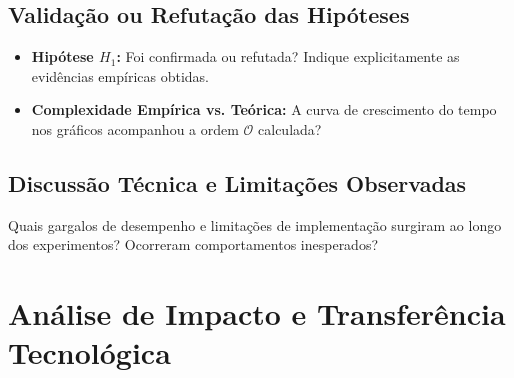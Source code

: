 \documentclass[11pt,a4paper]{article}
\begin{document}
\begin{table}[ht]
\centering
\caption{Desempenho comparativo de tempo e memória em função do tamanho da entrada $N$}
\label{tab:experimentos}
\end{table}

\subsection{Validação ou Refutação das Hipóteses}
\begin{itemize}
    \item \textbf{Hipótese $H_1$:} Foi confirmada ou refutada? Indique explicitamente as evidências empíricas obtidas.
    \item \textbf{Complexidade Empírica vs. Teórica:} A curva de crescimento do tempo nos gráficos acompanhou a ordem $\mathcal{O}$ calculada?
\end{itemize}

\subsection{Discussão Técnica e Limitações Observadas}
Quais gargalos de desempenho e limitações de implementação surgiram ao longo dos experimentos? Ocorreram comportamentos inesperados?

\section{Análise de Impacto e Transferência Tecnológica}
\end{document}
